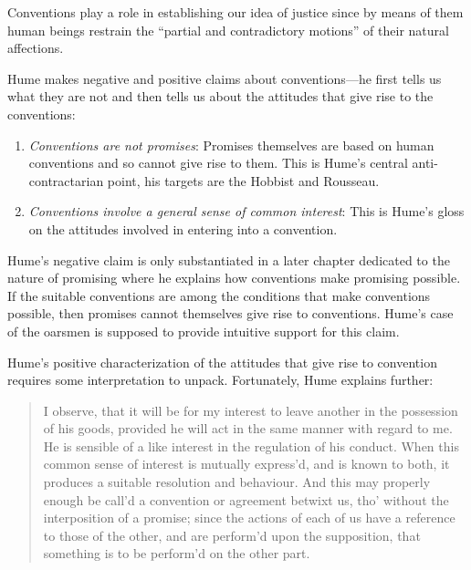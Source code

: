 Conventions play a role in establishing our idea of justice since by means of them human beings restrain the ``partial and contradictory motions'' of their natural affections.

Hume makes negative and positive claims about conventions---he first tells us what they are not and then tells us about the attitudes that give rise to the conventions:

\begin{enumerate}
	\item \emph{Conventions are not promises}: Promises themselves are based on human conventions and so cannot give rise to them. This is Hume's central anti-contractarian point, his targets are the Hobbist and Rousseau.
	\item \emph{Conventions involve a general sense of common interest}: This is Hume's gloss on the attitudes involved in entering into a convention.
\end{enumerate}

Hume's negative claim is only substantiated in a later chapter dedicated to the nature of promising where he explains how conventions make promising possible. If the suitable conventions are among the conditions that make conventions possible, then promises cannot themselves give rise to conventions. Hume's case of the oarsmen is supposed to provide intuitive support for this claim.

Hume's positive characterization of the attitudes that give rise to convention requires some interpretation to unpack. Fortunately, Hume explains further:

\begin{quote}
	I observe, that it will be for my interest to leave another in the possession of his goods, provided he will act in the same manner with regard to me. He is sensible of a like interest in the regulation of his conduct. When this common sense of interest is mutually express'd, and is known to both, it produces a suitable resolution and behaviour. And this may properly enough be call'd a convention or agreement betwixt us, tho' without the interposition of a promise; since the actions of each of us have a reference to those of the other, and are perform'd upon the supposition, that something is to be perform'd on the other part.
\end{quote}

